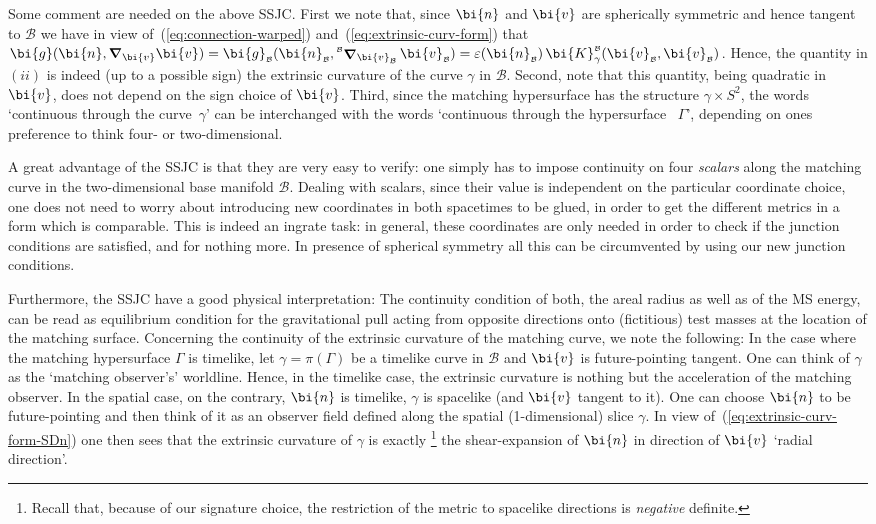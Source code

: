 \documentclass
[rmp,aps,twocolumn,showpacs,preprintnumbers,amsmath,amssymb]{revtex4}
\theoremstyle{plain}
\theoremstyle{definition}
\theoremstyle{remark}
\newcommand{\sss}{\scriptscriptstyle}
\DeclareMathOperator{\LC}{\bm{\nabla}}        %
\newcommand{\bnabla}{\boldsymbol{\nabla}}     %
\newcommand{\B}{\mathcal{B}}                      %
\newcommand{\Stwo}{{S^2}}                         %
\newcommand{\sB}{{\sss \B}}                       %
\newcommand{\gB}{\g_\sB}                          %
\DeclareMathOperator{\LCB}{\sideset{^\sB}{}{\LC}} %
\newcommand{\g}{\bg}                            %
\newcommand{\bg}{\bi{g}}
\newcommand{\bn}{\bi{n}}
\newcommand{\bv}{\bi{v}}
\newcommand{\bK}{\bi{K}}
\begin{document}
Some comment are needed on the above SSJC.
First we note that, since $\bn$ and $\bv$ are spherically symmetric and 
hence tangent to $\B$ we have in view of~(\ref{eq:connection-warped}) 
and~(\ref{eq:extrinsic-curv-form}) that $\g(\bn,\bnabla_\bv\bv)
= \gB(\bn_\sB,\!\LCB_{\bv_\sB}\bv_\sB) 
= \varepsilon(\bn_\sB)\,\bK_\gamma^\sB(\bv_\sB,\bv_\sB)$.
Hence, the quantity in $(ii)$ is indeed (up to a possible sign) the 
extrinsic curvature of the curve $\gamma$ in $\B$. Second, note that this
quantity, being quadratic in $\bv$, does not depend on the sign choice of
$\bv$. 
Third, since the matching hypersurface has the structure 
$\gamma\times\Stwo$, the words `continuous through the curve~$\gamma$' can 
be interchanged with the words `continuous through the hypersurface~%
$\varGamma$', depending on ones preference to think four- or two-dimensional.

A great advantage of the SSJC is that they are very easy to verify: one 
simply has to impose continuity on four \emph{scalars} along the matching 
curve in the two-dimensional base manifold $\B$. Dealing with scalars, since 
their value is independent on the particular coordinate choice, one does
not need to worry about introducing new coordinates in both spacetimes 
to be glued, in order to get the different metrics in a form which is 
comparable. This is indeed an ingrate task: in general, these coordinates 
are only needed in order to check if the junction conditions are satisfied, 
and for nothing more. In presence of spherical symmetry all this can be 
circumvented by using our new junction conditions.

Furthermore, the SSJC have a good physical interpretation: The continuity 
condition of both, the areal radius as well as of the MS energy, can be 
read as equilibrium condition for the gravitational pull acting from 
opposite directions onto (fictitious) test masses at the location of the 
matching surface. Concerning the continuity of the extrinsic curvature of 
the matching curve, we note the following: In the case where the matching 
hypersurface $\varGamma$ is timelike, let $\gamma=\pi(\varGamma)$ be a 
timelike curve in $\B$ and $\bv$ is future-pointing tangent. 
One can think of $\gamma$ as the `matching observer's' worldline. 
Hence, in the timelike case, the extrinsic curvature is nothing but 
the acceleration of the matching observer. In the spatial case, on 
the contrary, $\bn$ is timelike, $\gamma$ is spacelike (and $\bv$ 
tangent to it). One can choose $\bn$ to be future-pointing and then 
think of it as an observer field defined along the spatial (1-dimensional) 
slice $\gamma$. In view of~(\ref{eq:extrinsic-curv-form-SDn}) one 
then sees that the extrinsic curvature of $\gamma$ is exactly%
\footnote{Recall that, because of our signature choice, the restriction 
of the metric to spacelike directions is \emph{negative} definite.}
the shear-expansion of $\bn$ in direction of $\bv$ `radial direction'.
\end{document}
